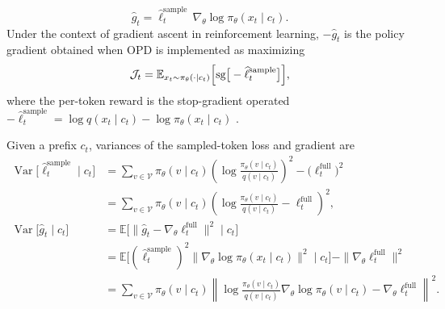 \documentclass{article} %
\begin{document}
\begin{equation}
    \widehat{g}_t=\widehat{\ell}^{\mathrm{sample}}_t\,
    \nabla_\theta\log\pi_\theta(x_t\mid c_t). 
    \label{eq:sampled_token_grad}
\end{equation}
Under the context of gradient ascent in reinforcement learning, $-\widehat{g}_t$ is the policy gradient obtained when OPD is implemented as maximizing
\begin{equation}
\begin{aligned}
  \mathcal{J}_t = \mathbb{E}_{x_t\sim\pi_\theta(\cdot\mid c_t)}\Bigl[\text{sg}\big[-\widehat{\ell}^{\mathrm{sample}}_t\big]\Bigr],
\end{aligned} 
\end{equation}
where the per-token reward is the stop-gradient operated $-\widehat{\ell}^{\mathrm{sample}}_t = \log q(x_t\mid c_t)-\log\pi_\theta(x_t\mid c_t)$ \citep{lu2025onpolicydistillation, oh2026klforkl}. 

Given a prefix $c_t$, variances of the sampled-token loss and gradient are
\begin{align}
    \operatorname{Var}\bigl[\widehat{\ell}^{\mathrm{sample}}_t\mid c_t\bigr]
    &=\sum_{v\in\mathcal{V}}\pi_\theta(v\mid c_t)
      \left(\log\frac{\pi_\theta(v\mid c_t)}{q(v\mid c_t)}\right)^2
      -\bigl(\ell^{\mathrm{full}}_t\bigr)^2
    \nonumber\\
    &=\sum_{v\in\mathcal{V}}\pi_\theta(v\mid c_t)
      \left(\log\frac{\pi_\theta(v\mid c_t)}{q(v\mid c_t)}
      -\ell^{\mathrm{full}}_t\right)^2,
    \label{eq:sampled_token_variance}\\
    \operatorname{Var}\bigl[\widehat{g}_t\mid c_t\bigr]
    &=\mathbb{E}\bigl[\|\widehat{g}_t-\nabla_\theta\ell^{\mathrm{full}}_t\|^2\mid c_t\bigr]\nonumber\\
    &=\mathbb{E}\bigl[(\widehat{\ell}^{\mathrm{sample}}_t)^2
      \|\nabla_\theta\log\pi_\theta(x_t\mid c_t)\|^2\mid c_t\bigr]
      -\|\nabla_\theta\ell^{\mathrm{full}}_t\|^2
    \nonumber\\
    &=\sum_{v\in\mathcal{V}}\pi_\theta(v\mid c_t)
      \left\|\log\frac{\pi_\theta(v\mid c_t)}{q(v\mid c_t)}
      \nabla_\theta\log\pi_\theta(v\mid c_t)
      -\nabla_\theta\ell^{\mathrm{full}}_t\right\|^2.
    \label{eq:sampled_token_grad_variance}
\end{align}
\end{document}
